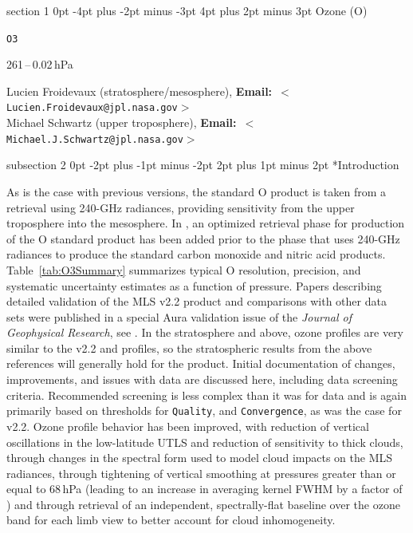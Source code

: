 \documentclass[11pt,draft]{report}
\makeatletter
\renewcommand{\section}{\@startsection%
  {section}%
  {1}%
  {0pt}%
  {-4pt plus -2pt minus -3pt}%
  {4pt plus 2pt minus 3pt}%
  {\Large\sffamily\fontseries{sb}\selectfont\flushleft\color{SectionColor}\figureversion{tabular}}}%
\renewcommand{\subsection}{\@startsection%
  {subsection}%
  {2}%
  {0pt}%
  {-2pt plus -1pt minus -2pt}%
  {2pt plus 1pt minus 2pt}%
  {\large\sffamily\fontseries{sb}\selectfont\flushleft\color{SectionColor}\figureversion{tabular}}}%
\newcommand{\speciestitle}[5][]{%
\cleardoublepage
\suppressfloats%
\thispagestyle{plain}%
{\noindent\colorbox{SectionBackground}{%
\begin{minipage}{\linewidth-2\fboxsep}%
\flushleft%
\section{#2 (#3)}%
\rhead{\large\sffamily\color{HeaderFooterColor}\nouppercase{\thesection.\
  #2 (#3)}}
\label{navSection#4}%
\label{sec:Standard#4}%
\color{SectionColor}\sffamily
\begin{description}[font=\sffamily\bfseries,topsep=0pt,partopsep=0pt]
\item[Swath name:] \texttt{#4} #1
#5
\end{description}
\end{minipage}}}%
\renewcommand{\currentnav}{#4}%
}
\newcommand{\email}[1]{\mbox{\textbf{Email:} $<$\texttt{#1}$>$}}
\newcommand{\currentnav}{BLANK}
\makeatother
\begin{document}

 \speciestitle{Ozone}{O}{O3}{%
\item[Useful range:] 261\,--\,0.02\,hPa  
\item[Contact:] Lucien Froidevaux (stratosphere/mesosphere), 
  \email{Lucien.Froidevaux@jpl.nasa.gov} \\ 
  Michael Schwartz (upper troposphere), 
  \email{Michael.J.Schwartz@jpl.nasa.gov}}
 
\subsection*{Introduction} 

As is the case with previous versions, the \thisv standard O
product is taken from a retrieval using 240-GHz radiances, 
providing sensitivity from the upper troposphere into the mesosphere.
In \thisv, an optimized retrieval phase for production of the O\cs3
standard product has been added prior to the phase that uses
240-GHz radiances to produce the standard  carbon monoxide and nitric 
acid products.  Table~\ref{tab:O3Summary}
summarizes typical O resolution, precision, and systematic uncertainty
estimates as a function of pressure.  Papers describing detailed
validation of the MLS v2.2 product and comparisons with other data sets
were published in a special Aura validation issue of the {\it Journal of
  Geophysical Research}, see
\citep{FroidevauxEtal08O3,JiangYEtal07,LiveseyEtal08}.  In the
stratosphere and above, \thisv ozone profiles are very similar to the
v2.2 and \prevvSlash profiles, so the stratospheric results from the
above references will generally hold for the product.  Initial
documentation of changes, improvements, and issues with \thisv data are
discussed here, including data screening criteria.  Recommended
screening is less complex than it was for \prevvSlash data and is again
primarily based on thresholds for \texttt{Quality}, and
\texttt{Convergence}, as was the case for v2.2.  Ozone profile behavior
has been improved, with reduction of vertical oscillations in the
low-latitude UTLS and reduction of sensitivity to thick clouds, 
through changes in the spectral form used to model cloud impacts on the
MLS radiances, through tightening of vertical smoothing at pressures greater
than or equal to 68\,hPa (leading to an increase in averaging kernel
FWHM by a factor of \texttildelow1.15) and through retrieval of an independent,
spectrally-flat baseline over the ozone band for each limb view to
better account for cloud inhomogeneity.
\end{document}
